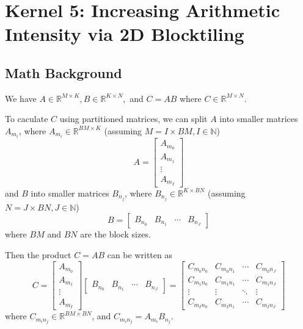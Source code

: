 \documentclass{article}
\begin{document}
\section{Kernel 5: Increasing Arithmetic Intensity via 2D Blocktiling}
\subsection{Math Background}
We have
$
    A \in \mathbb{R}^{M\times K},
    B \in \mathbb{R}^{K\times N},
$
and
$
    C=AB
$
where
$
    C \in \mathbb{R}^{M\times N}
$.

To caculate $C$ using partitioned matrices,
we can split $A$ into smaller matrices $A_{m_i}$,
where $A_{m_i} \in \mathbb{R}^{BM\times K}$
(assuming $M=I\times BM, I\in \mathbb{N}$)
\begin{equation}
    A=\begin{bmatrix}
        A_{m_0} \\
        A_{m_1} \\
        \vdots  \\
        A_{m_{I}}
    \end{bmatrix}
\end{equation}
and $B$ into smaller matrices $B_{n_j}$,
where $B_{n_j} \in \mathbb{R}^{K\times BN}$
(assuming $N=J \times BN, J\in \mathbb{N}$)
\begin{equation}
    B=\begin{bmatrix}
        B_{n_0} & B_{n_1} & \cdots & B_{n_{J}}
    \end{bmatrix}
\end{equation}
where $BM$ and $BN$ are the block sizes.

Then the product $C=AB$ can be written as
\begin{equation}
    C=
    \begin{bmatrix}
        A_{m_0} \\
        A_{m_1} \\
        \vdots  \\
        A_{m_{I}}
    \end{bmatrix}
    \begin{bmatrix}
        B_{n_0} & B_{n_1} & \cdots & B_{n_{J}}
    \end{bmatrix}
    =
    \begin{bmatrix}
        C_{m_0n_0}   & C_{m_0n_1}   & \cdots & C_{m_0n_{J}}   \\
        C_{m_1n_0}   & C_{m_1n_1}   & \cdots & C_{m_1n_{J}}   \\
        \vdots       & \vdots       & \ddots & \vdots         \\
        C_{m_{I}n_0} & C_{m_{I}n_1} & \cdots & C_{m_{I}n_{J}}
    \end{bmatrix}
    \label{C=AB}
\end{equation}
where $C_{m_in_j} \in \mathbb{R}^{BM\times BN}$, and $C_{m_in_j}=A_{m_i}B_{n_j}$.
\end{document}
